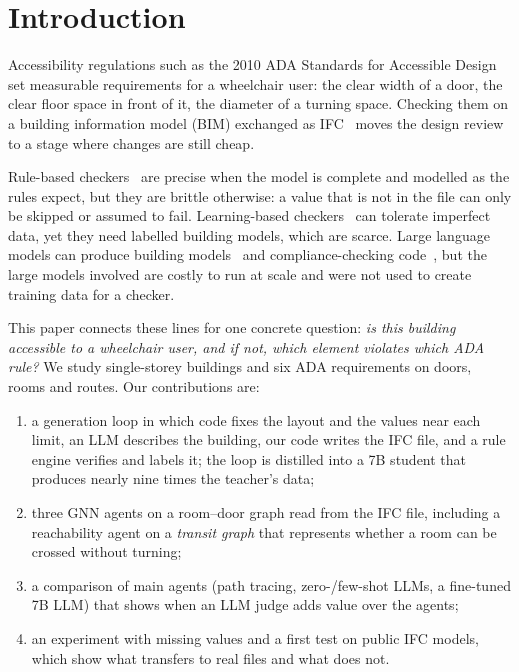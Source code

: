 \documentclass[conference]{IEEEtran}
\begin{document}
\section{Introduction}

Accessibility regulations such as the 2010 ADA Standards for Accessible Design~\cite{ada2010} set measurable
requirements for a wheelchair user: the clear width of a door, the clear floor space in front of it, the diameter
of a turning space. Checking them on a building information model (BIM) exchanged as IFC~\cite{iso16739} moves the
design review to a stage where changes are still cheap.

Rule-based checkers~\cite{eastman2009,solihin2015} are precise when the model is complete and modelled as the
rules expect, but they are brittle otherwise: a value that is not in the file can only be skipped or assumed to
fail. Learning-based checkers~\cite{bloch2023aei,bloch2023icccbe} can tolerate imperfect data, yet they need
labelled building models, which are scarce. Large language models can produce building models~\cite{du2024text2bim}
and compliance-checking code~\cite{fuchs2026}, but the large models involved are costly to run at scale and were not
used to create training data for a checker.

This paper connects these lines for one concrete question: \emph{is this building accessible to a wheelchair user,
and if not, which element violates which ADA rule?} We study single-storey buildings and six ADA requirements on
doors, rooms and routes. Our contributions are:
\begin{enumerate}
\item a generation loop in which code fixes the layout and the values near each limit, an LLM describes the
building, our code writes the IFC file, and a rule engine verifies and labels it; the loop is distilled into a 7B
student that produces nearly nine times the teacher's data;
\item three GNN agents on a room--door graph read from the IFC file, including a reachability agent on a
\emph{transit graph} that represents whether a room can be crossed without turning;
\item a comparison of main agents (path tracing, zero-/few-shot LLMs, a fine-tuned 7B LLM) that shows when an LLM
judge adds value over the agents;
\item an experiment with missing values and a first test on public IFC models, which show what transfers to real
files and what does not.
\end{enumerate}
\end{document}
